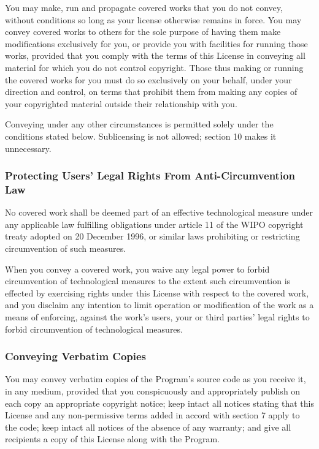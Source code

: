 \documentclass{ctexart}
\begin{document}
  You may make, run and propagate covered works that you do not
convey, without conditions so long as your license otherwise remains
in force.  You may convey covered works to others for the sole purpose
of having them make modifications exclusively for you, or provide you
with facilities for running those works, provided that you comply with
the terms of this License in conveying all material for which you do
not control copyright.  Those thus making or running the covered works
for you must do so exclusively on your behalf, under your direction
and control, on terms that prohibit them from making any copies of
your copyrighted material outside their relationship with you.

  Conveying under any other circumstances is permitted solely under
the conditions stated below.  Sublicensing is not allowed; section 10
makes it unnecessary.

\subsubsection{Protecting Users' Legal Rights From Anti-Circumvention Law}

  No covered work shall be deemed part of an effective technological
measure under any applicable law fulfilling obligations under article
11 of the WIPO copyright treaty adopted on 20 December 1996, or
similar laws prohibiting or restricting circumvention of such
measures.

  When you convey a covered work, you waive any legal power to forbid
circumvention of technological measures to the extent such circumvention
is effected by exercising rights under this License with respect to
the covered work, and you disclaim any intention to limit operation or
modification of the work as a means of enforcing, against the work's
users, your or third parties' legal rights to forbid circumvention of
technological measures.

\subsubsection{Conveying Verbatim Copies}

  You may convey verbatim copies of the Program's source code as you
receive it, in any medium, provided that you conspicuously and
appropriately publish on each copy an appropriate copyright notice;
keep intact all notices stating that this License and any
non-permissive terms added in accord with section 7 apply to the code;
keep intact all notices of the absence of any warranty; and give all
recipients a copy of this License along with the Program.
\end{document}
